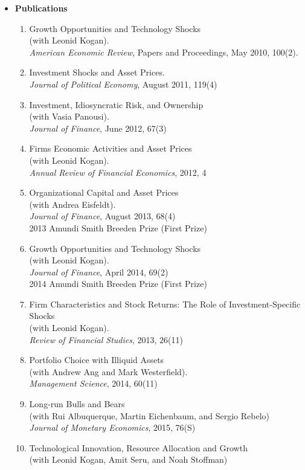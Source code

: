 \documentclass[12pt,letterpaper,serif,overlapped]{res}
\begin{document}
\begin{resume}
\begin{itemize}
\item \textbf{Publications}
\begin{enumerate}
\item Growth Opportunities and Technology Shocks\\ (with Leonid Kogan). \\
\emph{American Economic Review}, Papers and Proceedings, May 2010, 100(2).
\item Investment Shocks and Asset Prices.\\
\emph{Journal of Political Economy},  August 2011, 119(4)
\item Investment, Idiosyncratic Risk, and Ownership\\ (with Vasia Panousi).\\
\emph{Journal of Finance}, June 2012, 67(3)
\item Firms Economic Activities and Asset Prices\\ (with Leonid Kogan). \\
\emph{Annual Review of Financial Economics}, 2012, 4
\item Organizational Capital and Asset Prices\\ (with Andrea Eisfeldt).\\
\emph{Journal of Finance}, August 2013, 68(4)\\
 2013 Amundi Smith Breeden Prize (First Prize)
\item Growth Opportunities and Technology Shocks\\ (with Leonid Kogan).\\
\emph{Journal of Finance}, April 2014, 69(2)\\
 2014 Amundi Smith Breeden Prize (First Prize)
\item Firm Characteristics and Stock Returns: The Role of Investment-Specific Shocks\\ (with Leonid Kogan).\\
\emph{Review of Financial Studies}, 2013, 26(11)
\item Portfolio Choice with Illiquid Assets\\ (with Andrew Ang and Mark Westerfield).\\
\emph{Management Science},  2014, 60(11)
\item Long-run Bulls and Bears\\ (with Rui Albuquerque, Martin Eichenbaum, and Sergio Rebelo)\\
\emph{Journal of Monetary Economics}, 2015, 76(S)
\item Technological Innovation, Resource Allocation and Growth\\ (with Leonid Kogan, Amit Seru, and Noah Stoffman)\\

\end{enumerate}
\end{itemize}
\end{resume}
\end{document}
